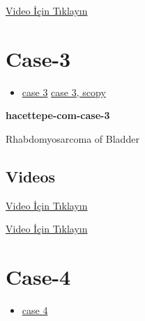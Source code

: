 \documentclass[
  letterpaper,
  DIV=11,
  numbers=noendperiod]{scrreprt}
\providecommand{\tightlist}{%
  \setlength{\itemsep}{0pt}\setlength{\parskip}{0pt}}\usepackage{longtable,booktabs,array}
\begin{document}
\href{https://www.youtube.com/watch?v=xHQihI19L5g}{Video İçin Tıklayın}

\hypertarget{sec-hacettepe-case-of-the-month-case-3}{%
\section{Case-3}\label{sec-hacettepe-case-of-the-month-case-3}}

\begin{itemize}
\tightlist
\item
  \href{https://www.youtube.com/watch?v=JGDsmznBqZM\&ab_channel=KemalKosemehmetoglu}{case
  3}
  \href{https://www.youtube.com/watch?v=yKnEyGE4oD4\&ab_channel=KemalKosemehmetoglu}{case
  3, scopy}
\end{itemize}

\textbf{hacettepe-com-case-3}

\begin{tcolorbox}[enhanced jigsaw, colbacktitle=quarto-callout-tip-color!10!white, colback=white, titlerule=0mm, opacityback=0, colframe=quarto-callout-tip-color-frame, opacitybacktitle=0.6, bottomrule=.15mm, breakable, coltitle=black, title=\textcolor{quarto-callout-tip-color}{\faLightbulb}\hspace{0.5em}{Tanı}, toprule=.15mm, toptitle=1mm, bottomtitle=1mm, arc=.35mm, rightrule=.15mm, leftrule=.75mm, left=2mm]

Rhabdomyosarcoma of Bladder

\end{tcolorbox}

\hypertarget{videos}{%
\subsection{Videos}\label{videos}}

\href{https://www.youtube.com/watch?v=JGDsmznBqZM}{Video İçin Tıklayın}

\href{https://www.youtube.com/watch?v=yKnEyGE4oD4}{Video İçin Tıklayın}

\hypertarget{sec-hacettepe-case-of-the-month-case-4}{%
\section{Case-4}\label{sec-hacettepe-case-of-the-month-case-4}}

\begin{itemize}
\tightlist
\item
  \href{https://www.youtube.com/watch?v=Akp6H3myCIo\&ab_channel=KemalKosemehmetoglu}{case
  4}
\end{itemize}
\end{document}
